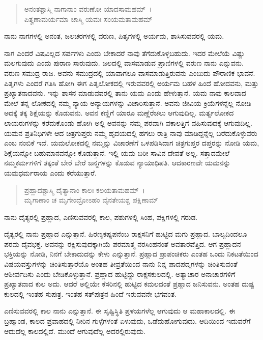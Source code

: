 \begin{verse}
ಅನಂತಶ್ಚಾಸ್ಮಿ ನಾಗಾನಾಂ ವರುಣೋ ಯಾದಸಾಮಹಮ್~।\\ಪಿತೄಣಾಮರ್ಯಮಾ ಚಾಸ್ಮಿ ಯಮಃ ಸಂಯಮತಾಮಹಮ್ 
\end{verse}

{\small ನಾನು ನಾಗಗಳಲ್ಲಿ ಅನಂತ, ಜಲಚರಗಳಲ್ಲಿ ವರುಣ, ಪಿತೃಗಳಲ್ಲಿ ಅರ್ಯಮ, ಶಾಸಿಸುವವರಲ್ಲಿ ಯಮ.}

ನಾಗ ಎಂದರೆ ವಿಷವಿಲ್ಲದ ಸರ್ಪಗಳು ಎಂದು ಬೇಕಾದರೆ ನಾವು ತೆಗೆದುಕೊಳ್ಳಬಹುದು. ಇದರ ಮೇಲೆಯೆ ವಿಷ್ಣು ಮಲಗುವುದು ಎಂದು ಪುರಾಣ ಸಾರುವುದು. ಜಲದಲ್ಲಿ ವಾಸಮಾಡುವ ಪ್ರಾಣಿಗಳಲ್ಲಿ ವರುಣ ನಾನು ಎನ್ನುವನು. ವರುಣ ಸಮುದ್ರ ರಾಜ. ಅವನು ಸಮುದ್ರದಲ್ಲಿ ಯಾವಾಗಲೂ ವಾಸಮಾಡುತ್ತಿರುವನು ಎಂಬುದು ಪೌರಾಣಿಕ ಭಾವನೆ. ಪಿತೃಗಳು ಎಂದರೆ ಗತಿಸಿ ಹೋಗಿ ಈಗ ಪಿತೃಲೋಕದಲ್ಲಿ ಇರುವವರಲ್ಲಿ ಅರ್ಯಮ ಬಹಳ ಹಿಂದೆ ಹೋದವನು, ಮತ್ತು ಪ್ರಖ್ಯಾತನಾದವನು. ಇನ್ನು ಶಾಸನ ಮಾಡುವವರಲ್ಲಿ ತಾನು ಯಮ ಎಂದು ಹೇಳುತ್ತಾನೆ. ಯಮ ನಾವು ಕಾಲವಾದ ಮೇಲೆ ತನ್ನ ಲೋಕದಲ್ಲಿ ನಮ್ಮ ನ್ಯಾಯ ಅನ್ಯಾಯಗಳನ್ನು ವಿಚಾರಿಸುತ್ತಾನೆ. ಅವನು ಜೀವಿಯ ಕ್ರಿಯೆಗಳನ್ನೆಲ್ಲ ನೋಡಿ ಅದಕ್ಕೆ ತಕ್ಕ ಶಿಕ್ಷೆಯನ್ನು ಕೊಡುವನು. ಅವನ ಕಣ್ಣಿಗೆ ಯಾರೂ ಮಣ್ಣೆರೆಚಲು ಆಗುವುದಿಲ್ಲ. ಮರ್ತ್ಯಲೋಕದ ಲಾಯರುಗಳನ್ನು ಕರೆದುಕೊಂಡು ಹೋಗಿ ಅಲ್ಲಿ ಅವನನ್ನು ನಮ್ಮ ಪರವಾಗಿ ವಕಾಲತ್ತಿಗೆ ವಹಿಸುವುದಕ್ಕೆ ಆಗುವುದಿಲ್ಲ. ಯಮನ ಪ್ರತಿನಿಧಿಗಳೇ ಆದ ಚಿತ್ರಗುಪ್ತರು ನಮ್ಮ ಹೃದಯದಲ್ಲಿ ಹಗಲು ರಾತ್ರಿ ನಾವು ಮಾಡಿದ್ದನ್ನೆಲ್ಲ ಬರೆದುಕೊಳ್ಳುವರು ಎಂಬ ನಂಬಿಕೆ ಇದೆ. ಯಮಲೋಕದಲ್ಲಿ ನಮ್ಮನ್ನು ವಿಚಾರಣೆಗೆ ಒಳಪಡಿಸಿದಾಗ ಚಿತ್ರಗುಪ್ತರ ದಪ್ತರನ್ನು ನೋಡಿ ಯಮ, ಶಿಕ್ಷೆಯನ್ನೋ ಬಹುಮಾನವನ್ನೋ ಕೊಡುತ್ತಾನೆ. ಇಲ್ಲಿ ಯಮ ಬರೀ ಸಾವಿನ ದೇವತೆ ಅಲ್ಲ. ಸತ್ತಾದಮೇಲೆ ನಮ್ಮಕರ್ಮಗಳಿಗೆ ತಕ್ಕಂತೆ ಬೇರೆ ಬೇರೆ ಜನ್ಮಗಳನ್ನು ಕೊಡುವ ನ್ಯಾಯಾಧಿಪತಿ. ಆದಕಾರಣವೇ ಯಮನನ್ನು ಯಮಧರ್ಮರಾಯ ಎಂದು ಕರೆಯುತ್ತಾರೆ.

\begin{verse}
ಪ್ರಹ್ಲಾದಶ್ಚಾಸ್ಮಿ ದೈತ್ಯಾನಾಂ ಕಾಲಃ ಕಲಯತಾಮಹಮ್~।\\ಮೃಗಾಣಾಂ ಚ ಮೃಗೇಂದ್ರೋಽಹಂ ವೈನತೇಯಶ್ಚ ಪಕ್ಷಿಣಾಮ್ 
\end{verse}

{\small ನಾನು ದೈತ್ಯರಲ್ಲಿ ಪ್ರಹ್ಲಾದ, ಎಣಿಸುವವರಲ್ಲಿ ಕಾಲ, ಪಶುಗಳಲ್ಲಿ ಸಿಂಹ, ಪಕ್ಷಿಗಳಲ್ಲಿ ಗರುಡ.}

ದೈತ್ಯರಲ್ಲಿ ನಾನು ಪ್ರಹ್ಲಾದ ಎನ್ನುತ್ತಾನೆ. ಹಿರಣ್ಯಕಷ್ಯಪನೆಂಬ ರಾಕ್ಷಸನಿಗೆ ಹುಟ್ಟಿದ ಮಗು ಪ್ರಹ್ಲಾದ. ಬಾಲ್ಯದಿಂದಲೂ ಪರಮ ದೈವಭಕ್ತ. ಅವನನ್ನು ರಕ್ಷಿಸುವುದಕ್ಕಾಗಿಯೆ ಪರಮಾತ್ಮ ನರಸಿಂಹನಂತೆ ಅವತಾರವೆತ್ತಿದ. ಆಗ ಪ್ರಹ್ಲಾದನ ಭಕ್ತಿಯನ್ನು ನೋಡಿ, ನಿನಗೆ ಬೇಕಾದುದನ್ನು ಕೇಳು ಎನ್ನುತ್ತಾನೆ. ಪ್ರಹ್ಲಾದ ಪ್ರಾಪಂಚಿಕರು ಎಂತಹ ಒಂದು ನಿಕಟತೆಯಿಂದ ವಿಷಯವಸ್ತುಗಳನ್ನು ಚಿಂತಿಸುತ್ತಾರೆಯೊ ಅಂತಹ ತೀವ್ರತೆಯಿಂದ ನಾನು ನಿನ್ನ ಪಾದಪದ್ಮಗಳನ್ನು ಚಿಂತಿಸುವಂತೆ ಆಶೀರ್ವದಿಸು ಎಂದು ಬೇಡಿಕೊಳ್ಳುತ್ತಾನೆ. ಪ್ರಹ್ಲಾದ ಹುಟ್ಟಿದ್ದು ರಾಕ್ಷಸಕುಲದಲ್ಲಿ. ಅತ್ಯಾಚಾರ ಅನಾಚಾರಗಳಿಗೆ ಪ್ರಖ್ಯಾತವಾದ ಕುಲ ಅದು. ಆದರೆ ಅಲ್ಲಿಯೇ ಕೆಸರಿನಲ್ಲಿ ಹುಟ್ಟಿದ ಕಮಲದಂತೆ ಪ್ರಹ್ಲಾದ ಜನಿಸುವನು. ಅಂತಹ ದುಷ್ಟ ಕುಲದಲ್ಲಿ ಇಂತಹ ಸುಪುತ್ರ. ಇಂತಹ ಸತ್​ಪುತ್ರನ ಹಿಂದೆ ಇರುವವನೇ ಭಗವಂತ.

ಎಣಿಸುವವರಲ್ಲಿ ಕಾಲ ನಾನು ಎನ್ನುತ್ತಾನೆ. ಈ ಸೃಷ್ಟಿಸ್ಥಿತಿ ಪ್ರಳಯಗಳೆಲ್ಲ ಆಗುವುದು ಆ ಮಹಾಕಾಲದಲ್ಲಿ. ಈ ಬ್ರಹ್ಮಾಂಡ, ಕಾಲದ ಪ್ರವಾಹದಲ್ಲಿ ನೀರಿನ ಗುಳ್ಳೆಗಳಂತೆ ಏಳುವುದು, ಒಡೆದುಹೋಗುವುದು. ಆದಿಯಿಂದ ಇದುವರೆಗೆ ಆದುದೆಲ್ಲ ಕಾಲದಲ್ಲಿದೆ. ಮುಂದೆ ಆಗುವುದೆಲ್ಲ ಅದರಲ್ಲಿರುವುದು.

